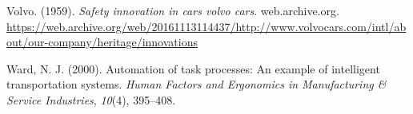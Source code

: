 \documentclass[
  man,floatsintext]{apa7}
\newlength{\cslhangindent}
\newlength{\cslentryspacingunit} %
\newenvironment{CSLReferences}[2] %
 {%
  \setlength{\parindent}{0pt}
  \ifodd #1
  \let\oldpar\par
  \def\par{\hangindent=\cslhangindent\oldpar}
  \fi
  \setlength{\parskip}{#2\cslentryspacingunit}
 }%
 {}
\begin{document}
\begin{CSLReferences}{1}{0}
\leavevmode{}%
Volvo. (1959). \emph{Safety innovation in cars \textbar{} volvo cars}. web.archive.org. \url{https://web.archive.org/web/20161113114437/http://www.volvocars.com/intl/about/our-company/heritage/innovations}

\leavevmode{}%
Ward, N. J. (2000). Automation of task processes: An example of intelligent transportation systems. \emph{Human Factors and Ergonomics in Manufacturing \& Service Industries}, \emph{10}(4), 395--408.

\end{CSLReferences}

\endgroup


\clearpage
\renewcommand{\listfigurename}{Figure captions}

\clearpage
\renewcommand{\listtablename}{Table captions}
\end{document}
